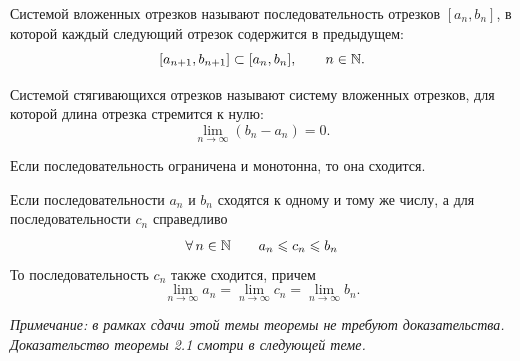 \setcounter{section}{1}


\begin{definition}
    Системой вложенных отрезков называют последовательность отрезков
    \([a_{n}, b_{n}]\), в которой каждый следующий отрезок содержится
    в предыдущем:
    \[[a_{n+1}, b_{n+1}] \subset [a_{n}, b_{n}],\qquad n\in\mathbb{N}.\]
\end{definition}

\begin{definition}
    Системой стягивающихся отрезков называют систему вложенных отрезков,
    для которой длина отрезка стремится к нулю:
    \[\lim_{n\to\infty}(b_{n}-a_{n})=0.\]
\end{definition}

\begin{theorem}
    Если последовательность ограничена и монотонна, то она сходится.
\end{theorem}

\begin{theorem}
    Если последовательности \(a_{n}\) и \(b_{n}\) сходятся к одному и тому же числу,
    а для последовательности \(c_{n}\) справедливо
    \[\forall\,n\in\mathbb{N} \qquad a_{n} \leqslant c_{n} \leqslant b_{n}\]
    То последовательность \(c_{n}\) также сходится, причем
    \[\lim_{ n \to \infty } a_{n} = \lim_{ n \to \infty } c_{n} = \lim_{ n \to \infty } b_{n}.\]
\end{theorem}

    \textit{Примечание: в рамках сдачи этой темы теоремы не требуют доказательства.
    Доказательство теоремы 2.1 смотри в следующей теме.}

    \vspace{2mm}

